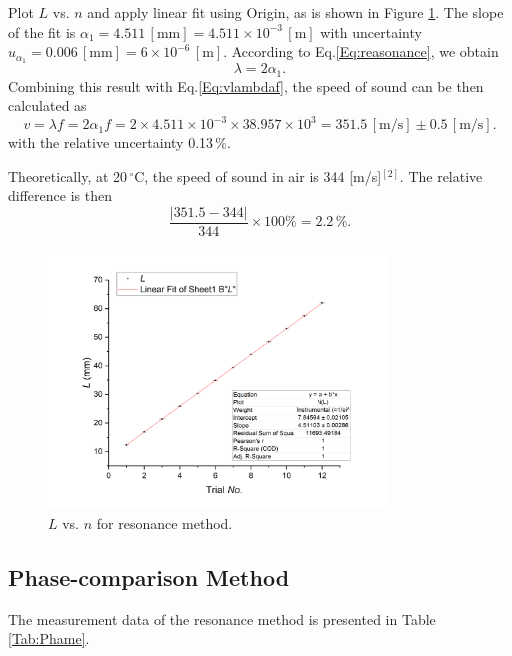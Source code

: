 \documentclass[a4paper]{article}
\begin{document}
Plot $L$ vs. $n$ and apply linear fit using Origin, as is shown in Figure \ref{Fig:plot1}. The slope of the fit is $\alpha_1 = 4.511\,[\text{mm}] = 4.511 \times 10^{-3}\,[\text{m}]$ with uncertainty $u_{\alpha_1} = 0.006\,[\text{mm}] = 6 \times 10^{-6}\,[\text{m}]$. According to Eq.\ref{Eq:reasonance}, we obtain
\[ \lambda = 2 \alpha_1.\]
Combining this result with Eq.\ref{Eq:vlambdaf}, the speed of sound can be then calculated as
\begin{equation}\label{Eq:calofrea}
v = \lambda f = 2 \alpha_1 f = 2 \times 4.511 \times 10^{-3} \times 38.957 \times 10^3 = 351.5\,[\text{m/s}] \pm 0.5\,[\text{m/s}].
\end{equation}
with the relative uncertainty 0.13\,\%.

Theoretically, at 20\,$^{\circ}$C, the speed of sound in air is 344 [m/s]$^{[2]}$. The relative difference is then
\[\frac{|351.5 - 344|}{344} \times 100\% = 2.2\,\%.\]

\begin{figure}[htbp]
\centering
\includegraphics[width=0.8\textwidth]{plot1.png}
\caption{$L$ vs. $n$ for resonance method.}\label{Fig:plot1}
\end{figure}



\subsection{Phase-comparison Method}

The measurement data of the resonance method is presented in Table \ref{Tab:Phame}. 
\end{document}
